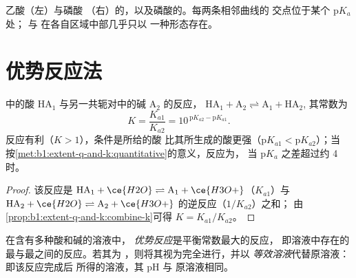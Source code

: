 \begin{omfigure}
{\small 乙酸（左）与磷酸
（右）的，以及磷酸的。每两条相邻曲线的
交点位于某个 $\mathrm{p}K_a$ 处；
 与  在各自区域中部几乎只以
一种形态存在。}
\end{omfigure}

\section{优势反应法}

\begin{proposition}[酸碱反应的常数]\label{prop:b1:predominant-reaction:k-of-reaction}
中的酸 $\mathrm{HA}_1$ 与另一共轭对中的碱
$\mathrm{A}_2$ 的反应，
$\mathrm{HA}_1 + \mathrm{A}_2 \rightleftharpoons \mathrm{A}_1 + \mathrm{HA}_2$,
其常数为
\[
  K = \frac{K_{a1}}{K_{a2}} = 10^{\,\mathrm{p}K_{a2} - \mathrm{p}K_{a1}} .
\]
反应有利（$K > 1$），条件是所给的酸
比其所生成的酸更强（$\mathrm{p}K_{a1} < \mathrm{p}K_{a2}$）；当
按\cref{met:b1:extent-q-and-k:quantitative}的意义，反应为，
当 $\mathrm{p}K_a$ 之差超过约 4 时。
\end{proposition}

\begin{proof}
该反应是 $\mathrm{HA}_1 + \ce{H2O} \rightleftharpoons
\mathrm{A}_1 + \ce{H3O+}$（$K_{a1}$）与 $\mathrm{HA}_2 +
\ce{H2O} \rightleftharpoons \mathrm{A}_2 + \ce{H3O+}$ 的逆反应（$1/K_{a2}$）之和；
由\cref{prop:b1:extent-q-and-k:combine-k}可得 $K = K_{a1}/K_{a2}$。
\end{proof}

\begin{definition}[优势反应与等效溶液]\label{def:b1:predominant-reaction:predominant-reaction}
在含有多种酸和碱的溶液中，
\emph{优势反应}是平衡常数最大的反应，
即溶液中存在的最与最之间的反应。若其为
，则将其视为完全进行，并以
\emph{等效溶液}代替原溶液：即该反应完成后
所得的溶液，其 pH 与
原溶液相同。
\end{definition}

